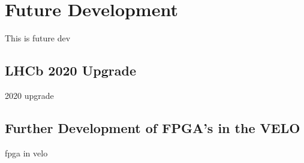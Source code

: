\section{Future Development}

	This is future dev

	\subsection{LHCb 2020 Upgrade}

	2020 upgrade

	\subsection{Further Development of FPGA's in the VELO}

	fpga in velo